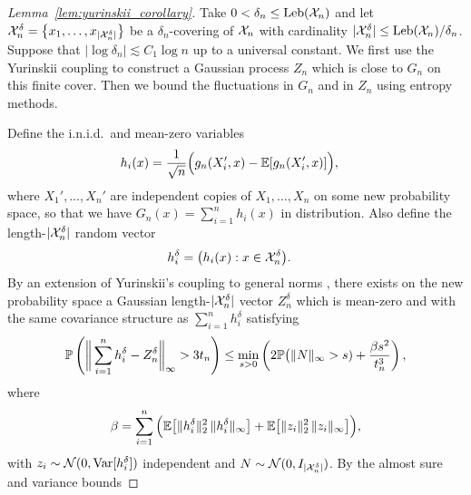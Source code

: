 \begin{proof}[Lemma~\ref{lem:yurinskii_corollary}]

  Take $0 < \delta_n \leq \Leb(\cX_n)$ and let
  $\cX_n^\delta = \big\{ x_1, \dots, x_{|\cX_n^\delta|}\big\}$
  be a $\delta_n$-covering of $\cX_n$ with cardinality
  $|\cX_n^\delta| \leq \Leb(\cX_n)/\delta_n$.
  Suppose that $\left|\log \delta_n\right| \lesssim C_1 \log n$
  up to a universal constant.
  We first use the Yurinskii coupling to
  construct a Gaussian process
  $Z_n$
  which is close to $G_n$
  on this finite cover.
  Then we bound the fluctuations in $G_n$
  and in $Z_n$
  using entropy methods.


  Define the i.n.i.d.\
  and mean-zero variables
  \begin{align*}
    h_i(x)
    &=
    \frac{1}{\sqrt n}
    \Big(
    g_n(X_i', x)
    - \E[g_n(X_i', x)]
    \Big),
  \end{align*}
  where $X_1', \ldots, X_n'$
  are independent copies of $X_1, \ldots, X_n$
  on some new probability space,
  so that we have
  $G_n(x) = \sum_{i=1}^n h_i(x)$
  in distribution.
  Also define the length-$|\cX_n^\delta|$ random vector
  \begin{align*}
    h_i^\delta
    &=
    \big(
    h_i(x): x \in \cX_n^\delta
    \big).
  \end{align*}
  By an extension of
  Yurinskii's coupling
  to general norms
  \citep[supplemental materials, Lemma~38]{belloni2019conditional},
  there exists on the new probability space a
  Gaussian length-$|\cX_n^\delta|$ vector $Z_n^\delta$
  which is mean-zero
  and with the same covariance structure as
  $
  \sum_{i=1}^n
  h_i^\delta
  $
  satisfying
  \begin{align*}
    \P\left(
      \bigg\|
      \sum_{i=1}^n
      h_i^\delta
      - Z_n^\delta
      \bigg\|_\infty
      > 3 t_n
    \right)
    \leq
    \min_{s > 0}
    \left(
      2 \P\big( \|N\|_\infty > s)
      + \frac{\beta s^2}{t_n^3}
    \right),
  \end{align*}
  where
  \begin{align*}
    \beta
    = \sum_{i=1}^n
    \Big(
    \E\big[\|h_i^\delta\|_2^2 \,
      \|h_i^\delta\|_\infty
      \big]
    + \E\big[\|z_i\|_2^2 \,
      \|z_i\|_\infty
      \big]
    \Big),
  \end{align*}
  with
  $z_i \sim \cN(0, \Var[h_i^\delta])$
  independent and
  $N \sim \cN(0, I_{|\cX_n^\delta|})$.
  By the almost sure
  and variance bounds

\end{proof}
